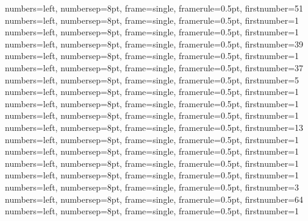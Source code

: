 {numbers=left, numbersep=8pt, frame=single, framerule=0.5pt, firstnumber=51}
{numbers=left, numbersep=8pt, frame=single, framerule=0.5pt, firstnumber=1}
{numbers=left, numbersep=8pt, frame=single, framerule=0.5pt, firstnumber=1}
{numbers=left, numbersep=8pt, frame=single, framerule=0.5pt, firstnumber=39}
{numbers=left, numbersep=8pt, frame=single, framerule=0.5pt, firstnumber=1}
{numbers=left, numbersep=8pt, frame=single, framerule=0.5pt, firstnumber=37}
{numbers=left, numbersep=8pt, frame=single, framerule=0.5pt, firstnumber=5}
{numbers=left, numbersep=8pt, frame=single, framerule=0.5pt, firstnumber=1}
{numbers=left, numbersep=8pt, frame=single, framerule=0.5pt, firstnumber=1}
{numbers=left, numbersep=8pt, frame=single, framerule=0.5pt, firstnumber=1}
{numbers=left, numbersep=8pt, frame=single, framerule=0.5pt, firstnumber=13}
{numbers=left, numbersep=8pt, frame=single, framerule=0.5pt, firstnumber=1}
{numbers=left, numbersep=8pt, frame=single, framerule=0.5pt, firstnumber=1}
{numbers=left, numbersep=8pt, frame=single, framerule=0.5pt, firstnumber=1}
{numbers=left, numbersep=8pt, frame=single, framerule=0.5pt, firstnumber=1}
{numbers=left, numbersep=8pt, frame=single, framerule=0.5pt, firstnumber=3}
{numbers=left, numbersep=8pt, frame=single, framerule=0.5pt, firstnumber=64}
{numbers=left, numbersep=8pt, frame=single, framerule=0.5pt, firstnumber=1}
